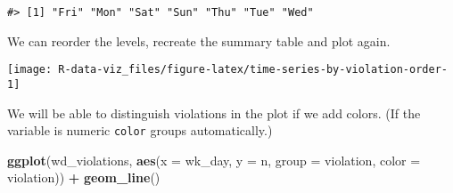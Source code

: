 \documentclass[]{book}
\newenvironment{Shaded}{\begin{snugshade}}{\end{snugshade}}
\newcommand{\DataTypeTok}[1]{\textcolor[rgb]{0.13,0.29,0.53}{#1}}
\newcommand{\KeywordTok}[1]{\textcolor[rgb]{0.13,0.29,0.53}{\textbf{#1}}}
\newcommand{\NormalTok}[1]{#1}
\newcommand{\OperatorTok}[1]{\textcolor[rgb]{0.81,0.36,0.00}{\textbf{#1}}}
\newcommand{\StringTok}[1]{\textcolor[rgb]{0.31,0.60,0.02}{#1}}
\begin{document}
\begin{Shaded}
\end{Shaded}

\begin{verbatim}
#> [1] "Fri" "Mon" "Sat" "Sun" "Thu" "Tue" "Wed"
\end{verbatim}

We can reorder the levels, recreate the summary table and plot again.

\begin{Shaded}
\end{Shaded}

\texttt{[image: R-data-viz\_files/figure-latex/time-series-by-violation-order-1]}

We will be able to distinguish violations in the plot if we add colors. (If the variable is numeric \texttt{color} groups automatically.)

\begin{Shaded}
\begin{Highlighting}[]
\KeywordTok{ggplot}\NormalTok{(wd_violations, }\KeywordTok{aes}\NormalTok{(}\DataTypeTok{x =}\NormalTok{ wk_day, }\DataTypeTok{y =}\NormalTok{ n, }\DataTypeTok{group =}\NormalTok{ violation, }\DataTypeTok{color =}\NormalTok{ violation)) }\OperatorTok{+}
\StringTok{  }\KeywordTok{geom_line}\NormalTok{()}
\end{Highlighting}
\end{Shaded}
\end{document}
